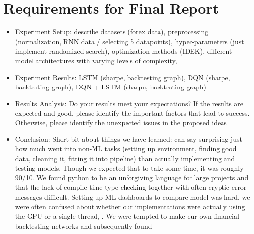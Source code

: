 \documentclass{article}
\begin{document}
\section{Requirements for Final Report}
\begin{itemize}
    \item Experiment Setup: describe datasets (forex data), preprocessing (normalization, RNN data / selecting 5 datapoints), hyper-parameters (just implement randomized search), optimization methods (IDEK), different model architectures with varying levels of complexity, 
    
    \item Experiment Results: LSTM (sharpe, backtesting graph), DQN (sharpe, backtesting graph), DQN + LSTM (sharpe, backtesting graph)
    \item Results Analysis: Do your results meet your expectations? If the results are expected and good, please identify the important factors that lead to success. Otherwise, please identify the unexpected issues in the proposed ideas
    \item Conclusion: Short bit about things we have learned: can say surprising just how much went into non-ML tasks (setting up environment, finding good data, cleaning it, fitting it into pipeline) than actually implementing and testing models. Though we expected that to take some time, it was roughly 90/10. We found python to be an unforgiving language for large projects and that the lack of compile-time type checking together with often cryptic error messages difficult. Setting up ML dashboards to compare model was hard, we were often confused about whether our implementations were actually using the GPU or a single thread, . We were tempted to make our own financial backtesting networks and subsequently found 
\end{itemize}

  
  
\end{document}
